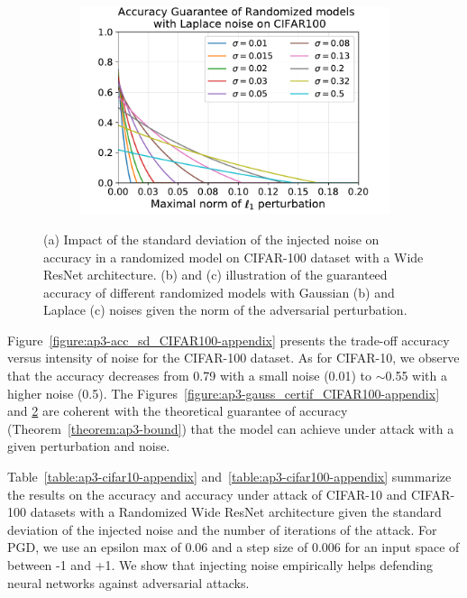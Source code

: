 \begin{figure}[htb]
\begin{subfigure}[t]{0.31\textwidth}
    \includegraphics[scale=0.32]{figures/appendix/ap3-randomized_inference/laplace_certif_CIFAR100.pdf}
    \caption{}
    \label{figure:ap3-laplace_certif_CIFAR100-appendix}
  \end{subfigure}
  \caption{(a) Impact of the standard deviation of the injected noise on accuracy in a randomized model on CIFAR-100 dataset with a Wide ResNet architecture. (b) and (c) illustration of the guaranteed accuracy of different randomized models with Gaussian (b) and Laplace (c) noises given the norm of the adversarial perturbation.}
\end{figure}

Figure~\ref{figure:ap3-acc_sd_CIFAR100-appendix} presents the trade-off accuracy versus intensity of noise for the CIFAR-100 dataset. As for CIFAR-10, we observe that the accuracy decreases from 0.79 with a small noise (0.01) to $\sim$0.55 with a higher noise (0.5). The Figures~\ref{figure:ap3-gauss_certif_CIFAR100-appendix} and \ref{figure:ap3-laplace_certif_CIFAR100-appendix} are coherent with the theoretical guarantee of accuracy (Theorem~\ref{theorem:ap3-bound}) that the model can achieve under attack with a given perturbation and noise.


Table~\ref{table:ap3-cifar10-appendix} and~\ref{table:ap3-cifar100-appendix} summarize the results on the accuracy and accuracy under attack of CIFAR-10 and CIFAR-100 datasets with a Randomized Wide ResNet architecture given the standard deviation of the injected noise and the number of iterations of the attack. For PGD, we use an epsilon max of 0.06 and a step size of 0.006 for an input space of between -1 and +1. We show that injecting noise empirically helps defending neural networks against adversarial attacks.


